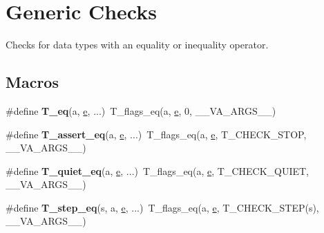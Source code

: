 \hypertarget{group__RTEMSTestFrameworkChecksGeneric}{}\section{Generic Checks}
\label{group__RTEMSTestFrameworkChecksGeneric}


Checks for data types with an equality or inequality operator.  


\subsection*{Macros}
\begin{DoxyCompactItemize}
\item 
\mbox{\label{group__RTEMSTestFrameworkChecksGeneric_ga415a912b589b913d2c2628e5b554058d}} 
\#define {\bfseries T\+\_\+eq}(a,  \mbox{\hyperlink{sun4u_2tte_8h_a8b0b9ed08e0e18920ec2682f48228c27}{e}}, ...)~T\+\_\+flags\+\_\+eq(a, \mbox{\hyperlink{sun4u_2tte_8h_a8b0b9ed08e0e18920ec2682f48228c27}{e}}, 0, \+\_\+\+\_\+\+V\+A\+\_\+\+A\+R\+G\+S\+\_\+\+\_\+)
\item 
\mbox{\label{group__RTEMSTestFrameworkChecksGeneric_ga2a1e2037fd670a958d10c4447b8ae476}} 
\#define {\bfseries T\+\_\+assert\+\_\+eq}(a,  \mbox{\hyperlink{sun4u_2tte_8h_a8b0b9ed08e0e18920ec2682f48228c27}{e}}, ...)~T\+\_\+flags\+\_\+eq(a, \mbox{\hyperlink{sun4u_2tte_8h_a8b0b9ed08e0e18920ec2682f48228c27}{e}}, T\+\_\+\+C\+H\+E\+C\+K\+\_\+\+S\+T\+OP, \+\_\+\+\_\+\+V\+A\+\_\+\+A\+R\+G\+S\+\_\+\+\_\+)
\item 
\mbox{\label{group__RTEMSTestFrameworkChecksGeneric_gaf03dd12766f89a2c334961c999fae4fb}} 
\#define {\bfseries T\+\_\+quiet\+\_\+eq}(a,  \mbox{\hyperlink{sun4u_2tte_8h_a8b0b9ed08e0e18920ec2682f48228c27}{e}}, ...)~T\+\_\+flags\+\_\+eq(a, \mbox{\hyperlink{sun4u_2tte_8h_a8b0b9ed08e0e18920ec2682f48228c27}{e}}, T\+\_\+\+C\+H\+E\+C\+K\+\_\+\+Q\+U\+I\+ET, \+\_\+\+\_\+\+V\+A\+\_\+\+A\+R\+G\+S\+\_\+\+\_\+)
\item 
\mbox{\label{group__RTEMSTestFrameworkChecksGeneric_ga2d0c1e782e4787cdf2a7828cbd90dfe9}} 
\#define {\bfseries T\+\_\+step\+\_\+eq}(s,  a,  \mbox{\hyperlink{sun4u_2tte_8h_a8b0b9ed08e0e18920ec2682f48228c27}{e}}, ...)~T\+\_\+flags\+\_\+eq(a, \mbox{\hyperlink{sun4u_2tte_8h_a8b0b9ed08e0e18920ec2682f48228c27}{e}}, T\+\_\+\+C\+H\+E\+C\+K\+\_\+\+S\+T\+EP(s), \+\_\+\+\_\+\+V\+A\+\_\+\+A\+R\+G\+S\+\_\+\+\_\+)

\end{DoxyCompactItemize}
